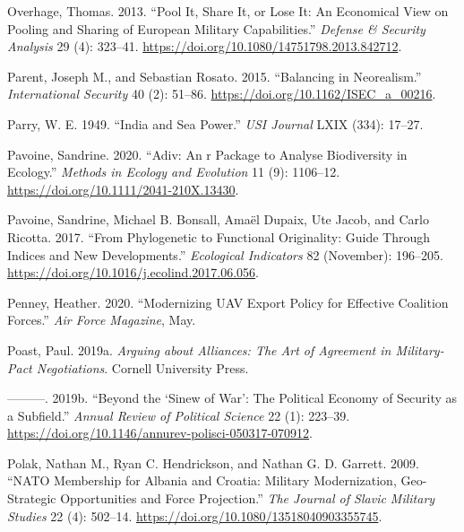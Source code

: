 \documentclass[
  12,
  letterpaper,
  DIV=11,
  numbers=noendperiod]{scrartcl}
\newlength{\cslhangindent}
\newlength{\cslentryspacingunit} %
\newenvironment{CSLReferences}[2] %
 {%
  \setlength{\parindent}{0pt}
  \ifodd #1
  \let\oldpar\par
  \def\par{\hangindent=\cslhangindent\oldpar}
  \fi
  \setlength{\parskip}{#2\cslentryspacingunit}
 }%
 {}
\begin{document}
\begin{CSLReferences}{1}{0}
\leavevmode{}%
Overhage, Thomas. 2013. {``Pool It, Share It, or Lose It: An Economical
View on Pooling and Sharing of {European} Military Capabilities.''}
\emph{Defense \& Security Analysis} 29 (4): 323--41.
\url{https://doi.org/10.1080/14751798.2013.842712}.

\leavevmode{}%
Parent, Joseph M., and Sebastian Rosato. 2015. {``Balancing in
{Neorealism}.''} \emph{International Security} 40 (2): 51--86.
\url{https://doi.org/10.1162/ISEC_a_00216}.

\leavevmode{}%
Parry, W. E. 1949. {``India and {Sea Power}.''} \emph{USI Journal} LXIX
(334): 17--27.

\leavevmode{}%
Pavoine, Sandrine. 2020. {``Adiv: {An} r Package to Analyse Biodiversity
in Ecology.''} \emph{Methods in Ecology and Evolution} 11 (9): 1106--12.
\url{https://doi.org/10.1111/2041-210X.13430}.

\leavevmode{}%
Pavoine, Sandrine, Michael B. Bonsall, Amaël Dupaix, Ute Jacob, and
Carlo Ricotta. 2017. {``From Phylogenetic to Functional Originality:
{Guide} Through Indices and New Developments.''} \emph{Ecological
Indicators} 82 (November): 196--205.
\url{https://doi.org/10.1016/j.ecolind.2017.06.056}.

\leavevmode{}%
Penney, Heather. 2020. {``Modernizing {UAV Export Policy} for {Effective
Coalition Forces}.''} \emph{Air Force Magazine}, May.

\leavevmode{}%
Poast, Paul. 2019a. \emph{Arguing about {Alliances}: {The Art} of
{Agreement} in {Military-Pact Negotiations}}. {Cornell University
Press}.

\leavevmode{}%
---------. 2019b. {``Beyond the {`{Sinew} of {War}'}: {The Political
Economy} of {Security} as a {Subfield}.''} \emph{Annual Review of
Political Science} 22 (1): 223--39.
\url{https://doi.org/10.1146/annurev-polisci-050317-070912}.

\leavevmode{}%
Polak, Nathan M., Ryan C. Hendrickson, and Nathan G. D. Garrett. 2009.
{``{NATO Membership} for {Albania} and {Croatia}: {Military
Modernization}, {Geo-Strategic Opportunities} and {Force Projection}.''}
\emph{The Journal of Slavic Military Studies} 22 (4): 502--14.
\url{https://doi.org/10.1080/13518040903355745}.


\end{CSLReferences}
\end{document}
